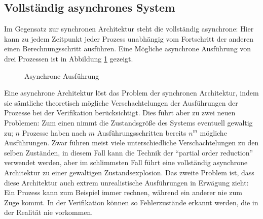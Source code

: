 \subsection{Vollständig asynchrones System}
Im Gegensatz zur synchronen Architektur steht die vollständig asynchrone: 
Hier kann zu jedem Zeitpunkt jeder Prozess unabhängig vom Fortschritt der anderen einen Berechnungsschritt ausführen.
Eine Mögliche asynchrone Ausführung von drei Prozessen ist in Abbildung \ref{fig:asynchronous_execution} gezeigt.
\begin{figure}[h]
  \centering
  \caption{Asynchrone Ausführung}
  \label{fig:asynchronous_execution}
\end{figure}

Eine asynchrone Architektur löst das Problem der synchronen Architektur, indem sie sämtliche theoretisch mögliche Verschachtelungen der Ausführungen der Prozesse bei der Verifikation berücksichtigt.
Dies führt aber zu zwei neuen Problemen:
Zum einen nimmt die Zustandsgröße des Systems eventuell gewaltig zu; $n$ Prozesse haben nach $m$ Ausführungsschritten bereits $n^m$ mögliche Ausführungen.
Zwar führen meist viele unterschiedliche Verschachtelungen zu den selben Zuständen, in diesem Fall kann die Technik der "`partial order reduction"'~\cite{partial_order_reduction} verwendet werden, aber im schlimmsten Fall führt eine vollständig asynchrone Architektur zu einer gewaltigen Zustandsexplosion.
Das zweite Problem ist, dass diese Architektur auch extrem unrealistische Ausführungen in Erwägung zieht:
Ein Prozess kann zum Beispiel immer rechnen, während ein anderer nie zum Zuge kommt.
In der Verifikation können so Fehlerzustände erkannt werden, die in der Realität nie vorkommen.

